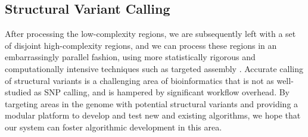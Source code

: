 \documentclass[12pt]{article}
\begin{document}
\vspace{-7pt}
\subsection{Structural Variant Calling}
\vspace{-6pt}

After processing the low-complexity regions, we are subsequently left with a set
of disjoint high-complexity regions, and we can process 
these regions in an embarrassingly parallel fashion, using more statistically rigorous
and computationally intensive techniques such as targeted assembly \cite{telescoper}.
Accurate calling of structural variants is a challenging area of bioinformatics
that is not as well-studied as SNP calling, and is hampered by significant
workflow overhead.  By targeting areas in the genome with potential structural
variants and providing a modular platform to develop and test new and existing
algorithms, we hope that our system can foster algorithmic development in this
area.

%
\end{document}
